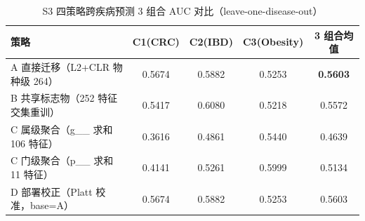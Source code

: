 \begin{table}[htbp]
\centering
\caption{S3 四策略跨疾病预测 3 组合 AUC 对比（leave-one-disease-out）}
\label{tab:s3-strategy-compare}
\begin{tabular}{lcccc}
\toprule
策略 & C1(CRC) & C2(IBD) & C3(Obesity) & 3 组合均值 \\
\midrule
A 直接迁移（L2+CLR 物种级 264） & 0.5674 & 0.5882 & 0.5253 & \textbf{0.5603} \\
B 共享标志物（252 特征交集重训） & 0.5417 & 0.6080 & 0.5218 & 0.5572 \\
C 属级聚合（g\_\_ 求和 106 特征） & 0.3616 & 0.4861 & 0.5440 & 0.4639 \\
C 门级聚合（p\_\_ 求和 11 特征） & 0.4141 & 0.5261 & 0.5999 & 0.5134 \\
D 部署校正（Platt 校准，base=A） & 0.5674 & 0.5882 & 0.5253 & 0.5603 \\
\bottomrule
\end{tabular}
\end{table}
